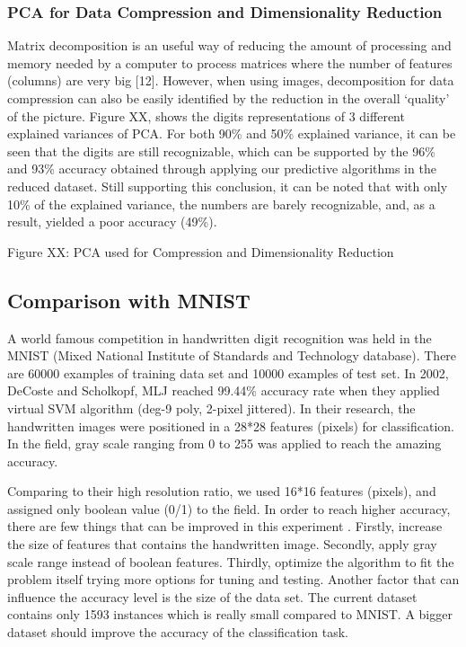 \documentclass[letterpaper,10pt]{article}
\theoremstyle{mytheor}
\begin{document}
\subsubsection{PCA for Data Compression and Dimensionality Reduction}

Matrix decomposition is an useful way of reducing the amount of processing and memory needed by a computer to process matrices where the number of features (columns) are very big [12]. However, when using images, decomposition for data compression can also be easily identified by the reduction in the overall ‘quality’ of the picture. Figure XX, shows the digits representations of 3 different explained variances of PCA. For both 90\% and 50\% explained variance, it can be seen that the digits are still recognizable, which can be supported by the 96\% and 93\% accuracy obtained through applying our predictive algorithms in the reduced dataset. Still supporting this conclusion, it can be noted that with only 10\% of the explained variance, the numbers are barely recognizable, and, as a result, yielded a poor accuracy (49\%).



Figure XX: PCA used for Compression and Dimensionality Reduction


\subsection{Comparison with MNIST}

A world famous competition in handwritten digit recognition was held in the MNIST (Mixed National Institute of Standards and Technology database). There are 60000 examples of training data set and 10000 examples of test set. In 2002, DeCoste and Scholkopf, MLJ reached 99.44\% accuracy rate when they applied virtual SVM algorithm (deg-9 poly, 2-pixel jittered). In their research, the handwritten images were positioned in a 28*28 features (pixels) for classification. In the field, gray scale ranging from 0 to 255 was applied to reach the amazing accuracy.

Comparing to their high resolution ratio, we used 16*16 features (pixels), and assigned only boolean value (0/1) to the field. In order to reach higher accuracy, there are few things that can be improved in this experiment . Firstly, increase the size of features that contains the handwritten image. Secondly, apply gray scale range instead of boolean features. Thirdly, optimize the algorithm to fit the problem itself trying more options for tuning and testing. Another factor that can influence the accuracy level is the size of the data set. The current dataset contains only 1593 instances which is really small compared to MNIST. A bigger dataset should improve the accuracy of the classification task.
\end{document}

